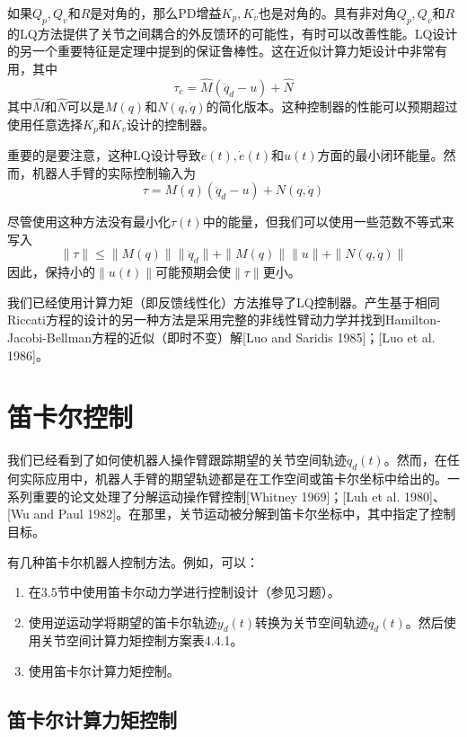 \documentclass[UTF8]{ctexart}
\theoremstyle{definition}
\begin{document}
如果$Q_p, Q_v$和$R$是对角的，那么PD增益$K_p, K_v$也是对角的。具有非对角$Q_p, Q_v$和$R$的LQ方法提供了关节之间耦合的外反馈环的可能性，有时可以改善性能。LQ设计的另一个重要特征是定理中提到的保证鲁棒性。这在近似计算力矩设计中非常有用，其中
\begin{equation}
    \tau_c = \hat{M}(\ddot{q}_d - u) + \hat{N}
\end{equation}
其中$\hat{M}$和$\hat{N}$可以是$M(q)$和$N(q, \dot{q})$的简化版本。这种控制器的性能可以预期超过使用任意选择$K_p$和$K_v$设计的控制器。

重要的是要注意，这种LQ设计导致$e(t), \dot{e}(t)$和$u(t)$方面的最小闭环能量。然而，机器人手臂的实际控制输入为
\begin{equation}
    \tau = M(q)(\ddot{q}_d - u) + N(q, \dot{q})
\end{equation}

尽管使用这种方法没有最小化$\tau(t)$中的能量，但我们可以使用一些范数不等式来写入
\begin{equation}
    \|\tau\| \leq \|M(q)\|\|\ddot{q}_d\| + \|M(q)\|\|u\| + \|N(q, \dot{q})\|
\end{equation}
因此，保持小的$\|u(t)\|$可能预期会使$\|\tau\|$更小。

我们已经使用计算力矩（即反馈线性化）方法推导了LQ控制器。产生基于相同Riccati方程的设计的另一种方法是采用完整的非线性臂动力学并找到Hamilton-Jacobi-Bellman方程的近似（即时不变）解[Luo and Saridis 1985]；[Luo et al. 1986]。

\section{笛卡尔控制}

我们已经看到了如何使机器人操作臂跟踪期望的关节空间轨迹$q_d(t)$。然而，在任何实际应用中，机器人手臂的期望轨迹都是在工作空间或笛卡尔坐标中给出的。一系列重要的论文处理了分解运动操作臂控制[Whitney 1969]；[Luh et al. 1980]、[Wu and Paul 1982]。在那里，关节运动被分解到笛卡尔坐标中，其中指定了控制目标。

有几种笛卡尔机器人控制方法。例如，可以：
\begin{enumerate}
\item 在3.5节中使用笛卡尔动力学进行控制设计（参见习题）。
\item 使用逆运动学将期望的笛卡尔轨迹$y_d(t)$转换为关节空间轨迹$q_d(t)$。然后使用关节空间计算力矩控制方案表4.4.1。
\item 使用笛卡尔计算力矩控制。
\end{enumerate}

\subsection{笛卡尔计算力矩控制}
\end{document}
